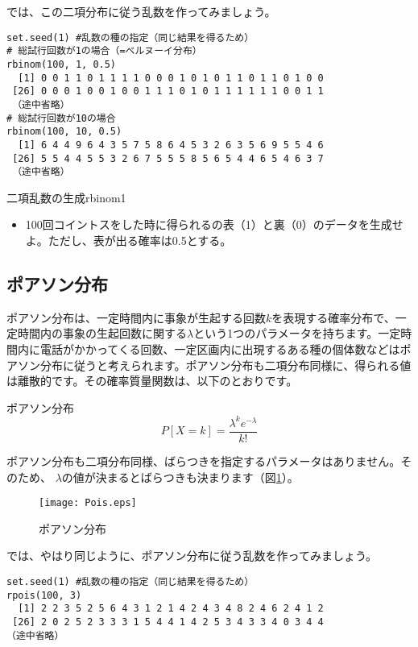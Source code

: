では、この二項分布に従う乱数を作ってみましょう。
\begin{verbatim}
set.seed(1) #乱数の種の指定（同じ結果を得るため）
# 総試行回数が1の場合（=ベルヌーイ分布）
rbinom(100, 1, 0.5)
  [1] 0 0 1 1 0 1 1 1 1 0 0 0 1 0 1 0 1 1 0 1 1 0 1 0 0
 [26] 0 0 0 1 0 0 1 0 0 1 1 1 0 1 0 1 1 1 1 1 1 0 0 1 1
 （途中省略）
# 総試行回数が10の場合
rbinom(100, 10, 0.5)
  [1] 6 4 4 9 6 4 3 5 7 5 8 6 4 5 3 2 6 3 5 6 9 5 5 4 6
 [26] 5 5 4 4 5 5 3 2 6 7 5 5 5 8 5 6 5 4 4 6 5 4 6 3 7
 （途中省略）
\end{verbatim}

\begin{exercise}{二項乱数の生成}{rbinom1}
\begin{itemize}
  \item 100回コイントスをした時に得られるの表（1）と裏（0）のデータを生成せよ。ただし、表が出る確率は0.5とする。
\end{itemize}
\end{exercise}

\subsection{ポアソン分布}
ポアソン分布は、一定時間内に事象が生起する回数$k$を表現する確率分布で、一定時間内の事象の生起回数に関する$\lambda$という1つのパラメータを持ちます。一定時間内に電話がかかってくる回数、一定区画内に出現するある種の個体数などはポアソン分布に従うと考えられます。ポアソン分布も二項分布同様に、得られる値は離散的です。その確率質量関数は、以下のとおりです。
\begin{itembox}[l]{ポアソン分布}
\begin{equation}
P[X=k] = \dfrac{\lambda^{k}e^{-\lambda}}{k!}
\end{equation}
\end{itembox}

ポアソン分布も二項分布同様、ばらつきを指定するパラメータはありません。そのため、
$\lambda$の値が決まるとばらつきも決まります（図\ref{Pois}）。
\begin{figure}[htb]
\begin{center}
\graphicspath{{3_glm/figs/}}
\texttt{[image: Pois.eps]}\\
\caption{ポアソン分布}
\label{Pois}
\end{center}
\end{figure}

では、やはり同じように、ポアソン分布に従う乱数を作ってみましょう。
\begin{verbatim}
set.seed(1) #乱数の種の指定（同じ結果を得るため）
rpois(100, 3)
  [1] 2 2 3 5 2 5 6 4 3 1 2 1 4 2 4 3 4 8 2 4 6 2 4 1 2
 [26] 2 0 2 5 2 3 3 3 1 5 4 4 1 4 2 5 3 4 3 3 4 0 3 4 4
（途中省略）
\end{verbatim}

